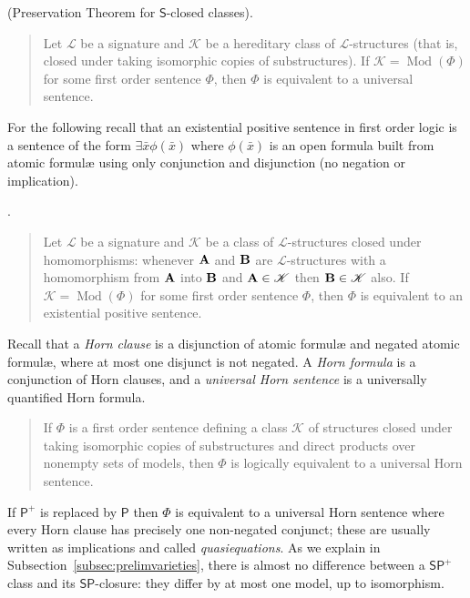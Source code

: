 \documentclass[reqno]{amsart}
\theoremstyle{plain}
\theoremstyle{definition}
\newcommand{\Mod}{\operatorname{Mod}}
\begin{document}
 (Preservation Theorem for $\mathsf{S}$-closed classes).
\begin{quotation}
Let $\mathcal{L}$ be a signature and $\mathscr{K}$ be a hereditary class of $\mathcal{L}$-structures (that is, closed under taking isomorphic copies of substructures). If $\mathscr{K}=\Mod(\Phi)$ for some first order sentence $\Phi$, then $\Phi$ is equivalent to a universal sentence.
\end{quotation}
For the following recall that an existential positive sentence in first order logic is a sentence of the form $
\exists \bar{x}\phi(\bar{x})$ where $\phi(\bar{x})$ is an open formula built from atomic formul{\ae} using only conjunction and disjunction (no negation or implication).
\medskip

.
\begin{quotation}
Let $\mathcal{L}$ be a signature and $\mathscr{K}$ be a class of $\mathcal{L}$-structures closed under homomorphisms: whenever ${\bf A}$ and ${\bf B}$ are $\mathcal{L}$-structures with a homomorphism from ${\bf A}$ into ${\bf B}$ and ${\bf A}\in \mathscr{K}$ then ${\bf B}\in \mathscr{K}$ also.  
If $\mathscr{K}=\Mod(\Phi)$ for some first order sentence $\Phi$, then $\Phi$ is equivalent to an existential positive sentence.
\end{quotation}
Recall that a \emph{Horn clause} is a disjunction of atomic formul{\ae} and negated atomic formul{\ae}, where at most one disjunct is not negated.  A \emph{Horn formula} is a conjunction of Horn clauses, and a \emph{universal Horn sentence} is a universally quantified Horn formula.
\medskip

\begin{quotation}
If $\Phi$ is a first order sentence defining a class $\mathscr{K}$ of structures closed under taking isomorphic copies of substructures and direct products over nonempty sets of models, then $\Phi$ is logically equivalent to a universal Horn sentence.
\end{quotation}
If $\mathsf{P}^+$ is replaced by $\mathsf{P}$ then $\Phi$ is equivalent to a universal Horn sentence where every Horn clause has precisely one non-negated conjunct; these are usually written as implications and called \emph{quasiequations}.
As we explain in Subsection~\ref{subsec:prelimvarieties}, there is almost no difference between a $\mathsf{SP}^+$ class and its $\mathsf{SP}$-closure: they differ by at most one model, up to isomorphism.
\end{document}
